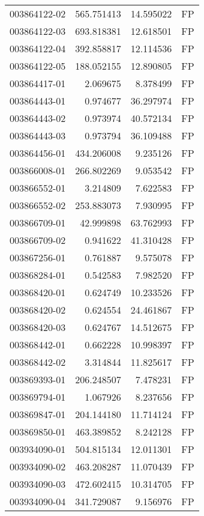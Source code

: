 \begin{tabular}{lrrl}
003864122-02 &  565.751413 &    14.595022 &   FP \\
003864122-03 &  693.818381 &    12.618501 &   FP \\
003864122-04 &  392.858817 &    12.114536 &   FP \\
003864122-05 &  188.052155 &    12.890805 &   FP \\
003864417-01 &    2.069675 &     8.378499 &   FP \\
003864443-01 &    0.974677 &    36.297974 &   FP \\
003864443-02 &    0.973974 &    40.572134 &   FP \\
003864443-03 &    0.973794 &    36.109488 &   FP \\
003864456-01 &  434.206008 &     9.235126 &   FP \\
003866008-01 &  266.802269 &     9.053542 &   FP \\
003866552-01 &    3.214809 &     7.622583 &   FP \\
003866552-02 &  253.883073 &     7.930995 &   FP \\
003866709-01 &   42.999898 &    63.762993 &   FP \\
003866709-02 &    0.941622 &    41.310428 &   FP \\
003867256-01 &    0.761887 &     9.575078 &   FP \\
003868284-01 &    0.542583 &     7.982520 &   FP \\
003868420-01 &    0.624749 &    10.233526 &   FP \\
003868420-02 &    0.624554 &    24.461867 &   FP \\
003868420-03 &    0.624767 &    14.512675 &   FP \\
003868442-01 &    0.662228 &    10.998397 &   FP \\
003868442-02 &    3.314844 &    11.825617 &   FP \\
003869393-01 &  206.248507 &     7.478231 &   FP \\
003869794-01 &    1.067926 &     8.237656 &   FP \\
003869847-01 &  204.144180 &    11.714124 &   FP \\
003869850-01 &  463.389852 &     8.242128 &   FP \\
003934090-01 &  504.815134 &    12.011301 &   FP \\
003934090-02 &  463.208287 &    11.070439 &   FP \\
003934090-03 &  472.602415 &    10.314705 &   FP \\
003934090-04 &  341.729087 &     9.156976 &   FP \\

\end{tabular}
